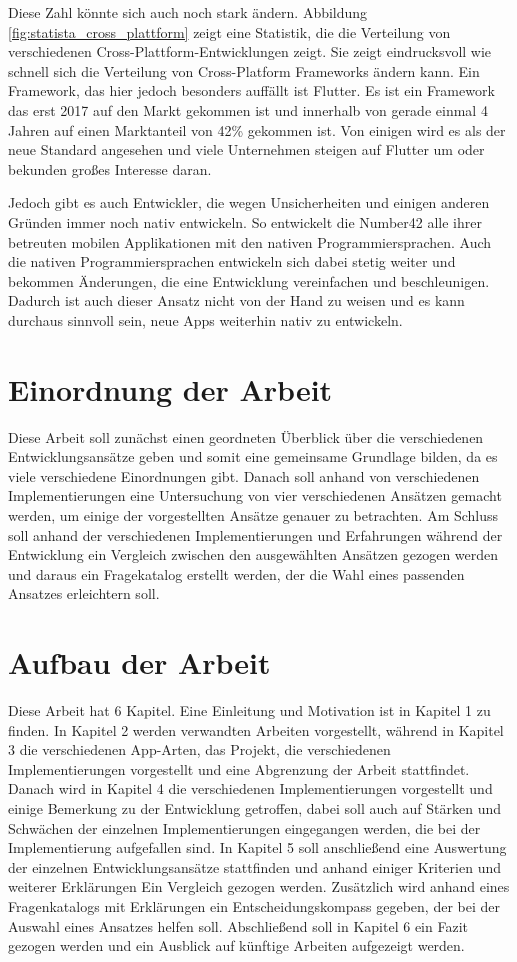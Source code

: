 Diese Zahl könnte sich auch noch stark ändern. Abbildung \ref{fig:statista_cross_plattform} zeigt eine Statistik, die die Verteilung von verschiedenen Cross-Plattform-Entwicklungen zeigt. Sie zeigt eindrucksvoll wie schnell sich die Verteilung von Cross-Platform Frameworks ändern kann. Ein Framework, das hier jedoch besonders auffällt ist Flutter. Es ist ein Framework das erst 2017 auf den Markt gekommen ist und innerhalb von gerade einmal 4 Jahren auf einen Marktanteil von 42\% gekommen ist. Von einigen wird es als der neue Standard angesehen und viele Unternehmen steigen auf Flutter um oder bekunden großes Interesse daran. 

Jedoch gibt es auch Entwickler, die wegen Unsicherheiten und einigen anderen Gründen immer noch nativ entwickeln. So entwickelt die Number42 alle ihrer betreuten mobilen Applikationen mit den nativen Programmiersprachen. Auch die nativen Programmiersprachen entwickeln sich dabei stetig weiter und bekommen Änderungen, die eine Entwicklung vereinfachen und beschleunigen. Dadurch ist auch dieser Ansatz nicht von der Hand zu weisen und es kann durchaus sinnvoll sein, neue Apps weiterhin nativ zu entwickeln.

\section{Einordnung der Arbeit}
Diese Arbeit soll zunächst einen geordneten Überblick über die verschiedenen Entwicklungsansätze geben und somit eine gemeinsame Grundlage bilden, da es viele verschiedene Einordnungen gibt.
Danach soll anhand von verschiedenen Implementierungen eine Untersuchung von vier verschiedenen Ansätzen gemacht werden, um einige der vorgestellten Ansätze genauer zu betrachten.
Am Schluss soll anhand der verschiedenen Implementierungen und Erfahrungen während der Entwicklung ein Vergleich zwischen den ausgewählten Ansätzen gezogen werden und daraus ein Fragekatalog erstellt werden, der die Wahl eines passenden Ansatzes erleichtern soll.


\section{Aufbau der Arbeit}
Diese Arbeit hat 6 Kapitel. Eine Einleitung und Motivation ist in Kapitel 1 zu finden. In Kapitel 2 werden verwandten Arbeiten vorgestellt, während in Kapitel 3 die verschiedenen App-Arten, das Projekt, die verschiedenen Implementierungen vorgestellt und eine Abgrenzung der Arbeit stattfindet.
Danach wird in Kapitel 4 die verschiedenen Implementierungen vorgestellt und einige Bemerkung zu der Entwicklung getroffen, dabei soll auch auf Stärken und Schwächen der einzelnen Implementierungen eingegangen werden, die bei der Implementierung aufgefallen sind.
In Kapitel 5 soll anschließend eine Auswertung der einzelnen Entwicklungsansätze stattfinden und anhand einiger Kriterien und weiterer Erklärungen Ein Vergleich gezogen werden. Zusätzlich wird anhand eines Fragenkatalogs mit Erklärungen ein Entscheidungskompass gegeben, der bei der Auswahl eines Ansatzes helfen soll.  Abschließend soll in Kapitel 6 ein Fazit gezogen werden und ein Ausblick auf künftige Arbeiten aufgezeigt werden.